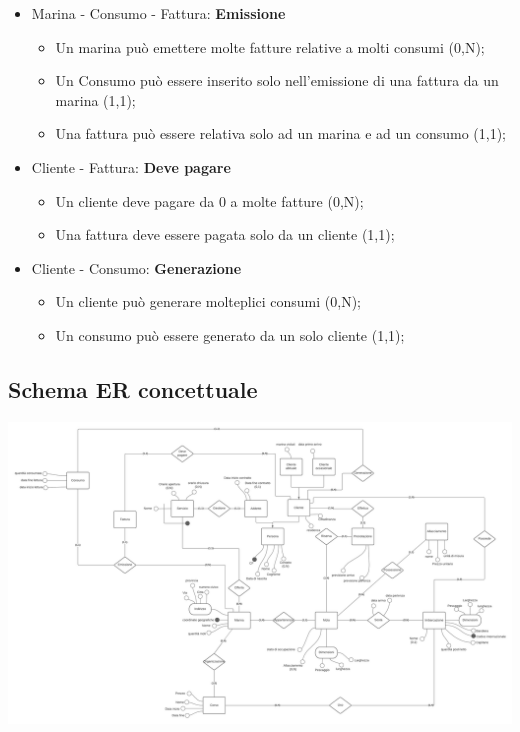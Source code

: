 \begin{itemize}
    \item Marina - Consumo - Fattura: \textbf{Emissione}
    \begin{itemize}
        \item Un marina può emettere molte fatture relative a molti consumi (0,N);
        \item Un Consumo può essere inserito solo nell'emissione di una fattura da un marina (1,1);
        \item Una fattura può essere relativa solo ad un marina e ad un consumo (1,1);
    \end{itemize}
    
    \item Cliente - Fattura: \textbf{Deve pagare}
    \begin{itemize}
        \item Un cliente deve pagare da 0 a molte fatture (0,N);
        \item Una fattura deve essere pagata solo da un cliente (1,1);
    \end{itemize}
    
    \item Cliente - Consumo: \textbf{Generazione}
    \begin{itemize}
        \item Un cliente può generare molteplici consumi (0,N);
        \item Un consumo può essere generato da un solo cliente (1,1);
    \end{itemize}
    
\end{itemize}

\subsection{Schema ER concettuale}
\includegraphics[width=\textwidth]{img/erconcettuale.png}